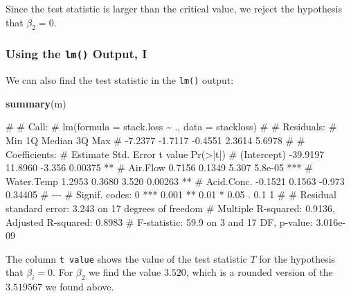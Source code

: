 \documentclass[
  a4paper,
]{article}
\newenvironment{Shaded}{\begin{snugshade}}{\end{snugshade}}
\newcommand{\FunctionTok}[1]{\textcolor[rgb]{0.13,0.29,0.53}{\textbf{#1}}}
\newcommand{\NormalTok}[1]{#1}
\theoremstyle{definition}
\theoremstyle{definition}
\theoremstyle{definition}
\theoremstyle{definition}
\theoremstyle{remark}
\begin{document}
Since the test statistic is larger than the critical value,
we reject the hypothesis that \(\beta_2 = 0\).

\subsubsection{\texorpdfstring{Using the \texttt{lm()} Output, I}{Using the lm() Output, I}}\label{using-the-lm-output-i}

We can also find the test statistic in the \texttt{lm()} output:

\begin{Shaded}
\begin{Highlighting}[]
\FunctionTok{summary}\NormalTok{(m)}
\end{Highlighting}
\end{Shaded}

\begin{Shaded}
\begin{Highlighting}[]
\NormalTok{\# }
\NormalTok{\# Call:}
\NormalTok{\# lm(formula = stack.loss \textasciitilde{} ., data = stackloss)}
\NormalTok{\# }
\NormalTok{\# Residuals:}
\NormalTok{\#     Min      1Q  Median      3Q     Max }
\NormalTok{\# {-}7.2377 {-}1.7117 {-}0.4551  2.3614  5.6978 }
\NormalTok{\# }
\NormalTok{\# Coefficients:}
\NormalTok{\#             Estimate Std. Error t value Pr(\textgreater{}|t|)    }
\NormalTok{\# (Intercept) {-}39.9197    11.8960  {-}3.356  0.00375 ** }
\NormalTok{\# Air.Flow      0.7156     0.1349   5.307  5.8e{-}05 ***}
\NormalTok{\# Water.Temp    1.2953     0.3680   3.520  0.00263 ** }
\NormalTok{\# Acid.Conc.   {-}0.1521     0.1563  {-}0.973  0.34405    }
\NormalTok{\# {-}{-}{-}}
\NormalTok{\# Signif. codes:  0 \textquotesingle{}***\textquotesingle{} 0.001 \textquotesingle{}**\textquotesingle{} 0.01 \textquotesingle{}*\textquotesingle{} 0.05 \textquotesingle{}.\textquotesingle{} 0.1 \textquotesingle{} \textquotesingle{} 1}
\NormalTok{\# }
\NormalTok{\# Residual standard error: 3.243 on 17 degrees of freedom}
\NormalTok{\# Multiple R{-}squared:  0.9136,  Adjusted R{-}squared:  0.8983 }
\NormalTok{\# F{-}statistic:  59.9 on 3 and 17 DF,  p{-}value: 3.016e{-}09}
\end{Highlighting}
\end{Shaded}

The column \texttt{t\ value} shows the value of the test statistic \(T\) for
the hypothesis that \(\beta_i = 0\). For \(\beta_2\) we find the value \(3.520\),
which is a rounded version of the \(3.519567\) we found above.
\end{document}
